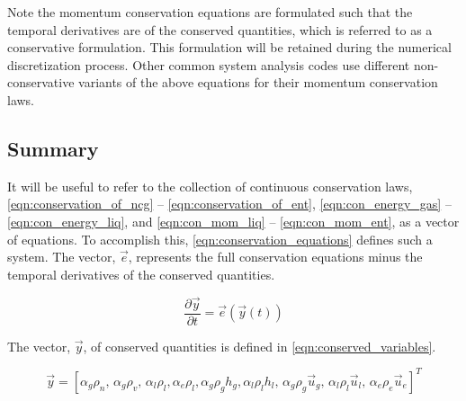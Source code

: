 Note the momentum conservation equations are formulated such that the temporal derivatives are of the conserved quantities, which is referred to as a conservative formulation.
This formulation will be retained during the numerical discretization process.
Other common system analysis codes \cite{TRACE, RELAP} use different non-conservative variants of the above equations for their momentum conservation laws.

\subsection{Summary}
\label{subsect:summary}

It will be useful to refer to the collection of continuous conservation laws, \eqref{eqn:conservation_of_ncg} -- \eqref{eqn:conservation_of_ent}, \eqref{eqn:con_energy_gas} -- \eqref{eqn:con_energy_liq}, and \eqref{eqn:con_mom_liq} -- \eqref{eqn:con_mom_ent}, as a vector of equations.
To accomplish this, \eqref{eqn:conservation_equations} defines such a system.
The vector, $\vec{e}$, represents the full conservation equations minus the temporal derivatives of the conserved quantities.

\begin{equation}
\label{eqn:conservation_equations}
\frac{\partial \vec{y} }{\partial t} = \vec{e}(\vec{y}(t))
\end{equation}

The vector, $\vec{y}$, of conserved quantities is defined in \eqref{eqn:conserved_variables}.

\begin{equation}
\label{eqn:conserved_variables}
\vec{y} = [\alpha_g \rho_n,\, \alpha_g \rho_v,\, \alpha_l \rho_l, \alpha_e \rho_l, \alpha_g \rho_g h_g, \alpha_l \rho_l h_l,\, \alpha_g \rho_g \vec{u}_g,\, \alpha_l \rho_l \vec{u}_l,\, \alpha_e \rho_e \vec{u}_e]^{T}
\end{equation}

